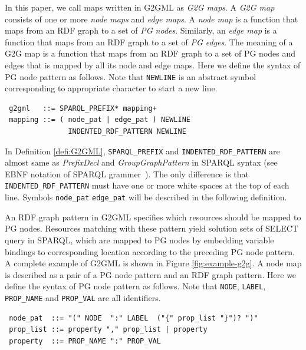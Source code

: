 \documentclass[runningheads]{llncs}
\begin{document}
\par
In this paper, we call maps written in G2GML as \textit{G2G maps}.
A \textit{G2G map} consists of one or more \textit{node maps} and \textit{edge maps}.
A \textit{node map} is a function that maps from an RDF graph to a set of \textit{PG nodes}. 
Similarly, an \textit{edge map} is a function that maps from an RDF graph to a set of \textit{PG edges}.
The meaning of a G2G map is a function that maps from an RDF graph to a set of PG nodes and edges that is mapped by  all its node and edge maps.
Here we define the syntax of PG node pattern as follows. 
Note that \texttt{NEWLINE} is an abstract symbol corresponding to appropriate character to start a new line. 

\begin{defi}
\label{defi:G2GML}
\leavevmode
\begin{verbatim}
 g2gml   ::= SPARQL_PREFIX* mapping+
 mapping ::= ( node_pat | edge_pat ) NEWLINE
               INDENTED_RDF_PATTERN NEWLINE
\end{verbatim}
\end{defi}
In Definition \ref{defi:G2GML}, \texttt{SPARQL\_PREFIX}
 and \texttt{INDENTED\_RDF\_PATTERN} are almost same as \textit{PrefixDecl} and \textit{GroupGraphPattern} in SPARQL syntax (see EBNF notation of SPARQL grammer~\cite{sparql}).
The only difference is that \texttt{INDENTED\_RDF\_PATTERN} must have one or more white spaces at the top of each line.
Symbols \texttt{node\_pat} \texttt{edge\_pat} will be described in the following definition.

An RDF graph pattern in G2GML specifies which resources should be mapped to PG nodes. Resources matching with these pattern yield solution sets of SELECT query in SPARQL, which 
 are mapped to PG nodes by embedding variable bindings to corresponding location according to the preceding PG node pattern.
A complete example of G2GML is shown in Figure \ref{fig:example-g2g}.
A node map is described as a pair of a PG node pattern  and an RDF graph pattern. Here we define the syntax of PG node pattern as follows. Note that \texttt{NODE}, \texttt{LABEL}, \texttt{PROP\_NAME} and \texttt{PROP\_VAL} are all identifiers.
\begin{defi}
\leavevmode
\begin{verbatim}
 node_pat  ::= "(" NODE  ":" LABEL  ("{" prop_list "}")? ")"
 prop_list ::= property "," prop_list | property
 property  ::= PROP_NAME ":" PROP_VAL
\end{verbatim}
\end{defi}
\end{document}
